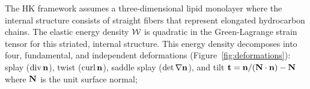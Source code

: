 
\sloppy
The HK framework assumes a three-dimensional lipid monolayer where the internal structure
consists of straight fibers that represent elongated hydrocarbon chains.
The elastic energy density ${\cal W}$ is quadratic in the Green-Lagrange strain
tensor for this striated, internal structure.
%
%
%
%
%
This energy density decomposes into four, fundamental, and independent
deformations (Figure~\ref{fig:deformations}): splay ($\operatorname{div} {\bf n}$),
twist ($\operatorname{curl} {\bf n}$), saddle splay ($\det \nabla {\bf n}$), and tilt
${\bf t}={\bf n}/({\bf N}\cdot {\bf n}) - {\bf N}$ where ${\bf N}$ is
the unit surface normal;
